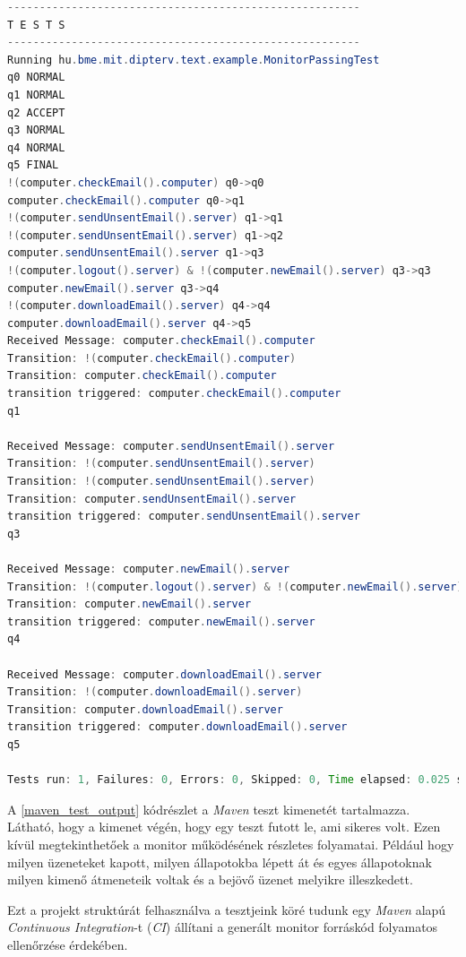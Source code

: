 \begin{lstlisting}[language=java, frame=single, float=ht!, caption={Teszteset eredménye.},captionpos=b,label=maven_test_output]
-------------------------------------------------------
T E S T S
-------------------------------------------------------
Running hu.bme.mit.dipterv.text.example.MonitorPassingTest
q0 NORMAL
q1 NORMAL
q2 ACCEPT
q3 NORMAL
q4 NORMAL
q5 FINAL
!(computer.checkEmail().computer) q0->q0
computer.checkEmail().computer q0->q1
!(computer.sendUnsentEmail().server) q1->q1
!(computer.sendUnsentEmail().server) q1->q2
computer.sendUnsentEmail().server q1->q3
!(computer.logout().server) & !(computer.newEmail().server) q3->q3
computer.newEmail().server q3->q4
!(computer.downloadEmail().server) q4->q4
computer.downloadEmail().server q4->q5
Received Message: computer.checkEmail().computer
Transition: !(computer.checkEmail().computer)
Transition: computer.checkEmail().computer
transition triggered: computer.checkEmail().computer
q1

Received Message: computer.sendUnsentEmail().server
Transition: !(computer.sendUnsentEmail().server)
Transition: !(computer.sendUnsentEmail().server)
Transition: computer.sendUnsentEmail().server
transition triggered: computer.sendUnsentEmail().server
q3

Received Message: computer.newEmail().server
Transition: !(computer.logout().server) & !(computer.newEmail().server)
Transition: computer.newEmail().server
transition triggered: computer.newEmail().server
q4

Received Message: computer.downloadEmail().server
Transition: !(computer.downloadEmail().server)
Transition: computer.downloadEmail().server
transition triggered: computer.downloadEmail().server
q5

Tests run: 1, Failures: 0, Errors: 0, Skipped: 0, Time elapsed: 0.025 sec
\end{lstlisting}

A \ref{maven_test_output} kódrészlet a \textit{Maven} teszt kimenetét tartalmazza.
Látható, hogy a kimenet végén, hogy egy teszt futott le, ami sikeres volt.
Ezen kívül megtekinthetőek a monitor működésének részletes folyamatai.
Például hogy milyen üzeneteket kapott, milyen állapotokba lépett át és egyes állapotoknak milyen kimenő átmeneteik voltak és a bejövő üzenet melyikre illeszkedett.

Ezt a projekt struktúrát felhasználva a tesztjeink köré tudunk egy \textit{Maven} alapú \textit{Continuous Integration}-t (\textit{CI}) állítani a generált monitor forráskód folyamatos ellenőrzése érdekében.

